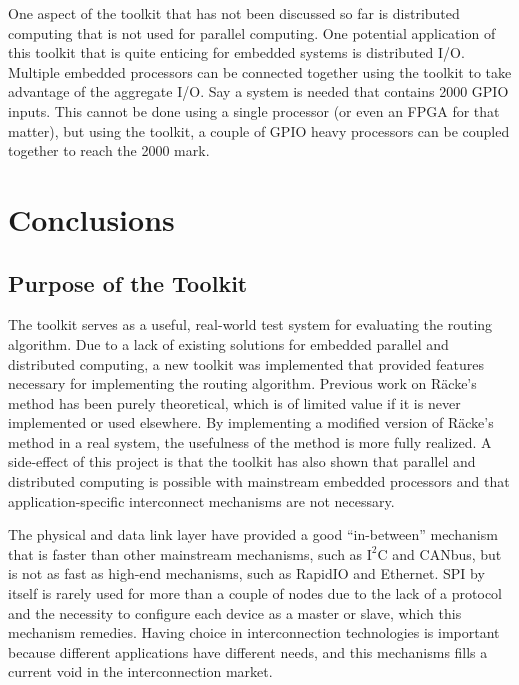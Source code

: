 One aspect of the toolkit that has not been discussed so far is distributed computing that is not used for parallel computing. One potential application of this toolkit that is quite enticing for embedded systems is distributed I/O. Multiple embedded processors can be connected together using the toolkit to take advantage of the aggregate I/O. Say a system is needed that contains 2000 GPIO inputs. This cannot be done using a single processor (or even an FPGA for that matter), but using the toolkit, a couple of GPIO heavy processors can be coupled together to reach the 2000 mark.

\section{Conclusions} \label{sec:conclusions:conclusions}

\subsection{Purpose of the Toolkit} \label{sec:conclusions:conclusions:toolkit}

The toolkit serves as a useful, real-world test system for evaluating the routing algorithm. Due to a lack of existing solutions for embedded parallel and distributed computing, a new toolkit was implemented that provided features necessary for implementing the routing algorithm. Previous work on R\"acke's method has been purely theoretical, which is of limited value if it is never implemented or used elsewhere. By implementing a modified version of R\"acke's method in a real system, the usefulness of the method is more fully realized. A side-effect of this project is that the toolkit has also shown that parallel and distributed computing is possible with mainstream embedded processors and that application-specific interconnect mechanisms are not necessary.

The physical and data link layer have provided a good ``in-between'' mechanism that is faster than other mainstream mechanisms, such as $\textrm{I}^2\textrm{C} $ and CANbus, but is not as fast as high-end mechanisms, such as RapidIO and Ethernet. SPI by itself is rarely used for more than a couple of nodes due to the lack of a protocol and the necessity to configure each device as a master or slave, which this mechanism remedies. Having choice in interconnection technologies is important because different applications have different needs, and this mechanisms fills a current void in the interconnection market.

